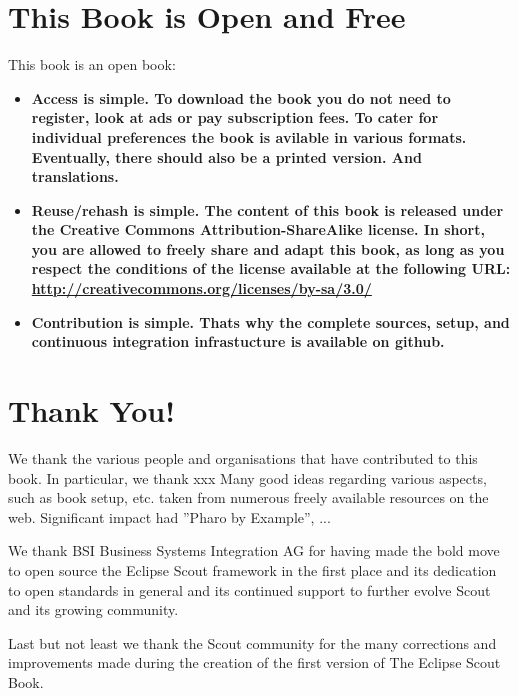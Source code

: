 \documentclass[a4paper,10pt,twoside]{book}
\begin{document}
\newpage

\section*{This Book is Open and Free}

This book is an open book:

\begin{itemize}

\item \bf{Access is simple}. To download the book you 
do not need to register, look at ads or pay subscription fees. To cater for individual
preferences the book is avilable in various formats. Eventually, there should 
also be a printed version. And translations.

\item \bf{Reuse/rehash is simple}. The content of this book 
is released under the Creative Commons Attribution-ShareAlike license.
In short, you are allowed to freely share and adapt this book, as long as you 
respect the conditions of the license available at the following URL: \\
\url{http://creativecommons.org/licenses/by-sa/3.0/}

\item \bf{Contribution is simple}. Thats why the complete sources, setup, 
and continuous integration infrastucture is available on github.

\end{itemize}


\section*{Thank You!}

We thank the various people and organisations that have contributed 
to this book. In particular, we thank xxx
Many good ideas regarding various aspects, such as book setup, etc. taken from 
numerous freely available resources on the web. 
Significant impact had ''Pharo by Example'', ...

We thank BSI Business Systems Integration AG for having made the bold move 
to open source the Eclipse Scout framework in the first place and its 
dedication to open standards in general and its continued support to further
evolve Scout and its growing community.

Last but not least we thank the Scout community for the many corrections and improvements 
made during the creation of the first version of The Eclipse Scout Book.


\ifx\wholebook\relax\else
   
   
\end{document}
